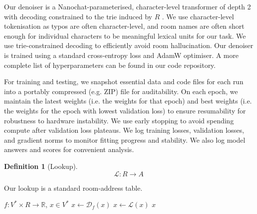 \documentclass{article}
\theoremstyle{definition}
\newtheorem{definition}{Definition}
\newcommand{\R}{\mathbb{R}}
\begin{document}
Our denoiser is a Nanochat-parameterised, character-level transformer of depth 2 with decoding constrained to the trie induced by $R$
\citep{nanochat}.
We use character-level tokenisation as typos are often character-level, and room names are often short enough for individual characters to be meaningful lexical units for our task.
We use trie-constrained decoding to efficiently avoid room hallucination.
Our denoiser is trained using a standard cross-entropy loss and AdamW optimiser.
A more complete list of hyperparameters can be found in our code repository.

For training and testing, we snapshot essential data and code files for each run into a portably compressed (e.g. ZIP) file for auditability.
On each epoch, we maintain the latest weights (i.e. the weights for that epoch) and best weights (i.e. the weights for the epoch with lowest validation loss) to ensure resumability for robustness to hardware instability.
We use early stopping to avoid spending compute after validation loss plateaus.
We log training losses, validation losses, and gradient norms to monitor fitting progress and stability.
We also log model answers and scores for convenient analysis.

\begin{definition}[Lookup]
$$
	\mathscr{L}:R\to A
$$
\end{definition}

Our lookup is a standard room-address table.



\begin{algorithm}[H]
	\caption{$\textsc{Infer}(f,x)$}
	\begin{algorithmic}
		\Require $f:V^{*}\times R\to\R$, $x\in V^{*}$
			$x\gets\mathscr{D}_{f}(x)$
		\EndIf
		\State $x\gets\mathscr{L}(x)$
		\State \Return $x$
	\end{algorithmic}
\end{algorithm}
\end{document}

